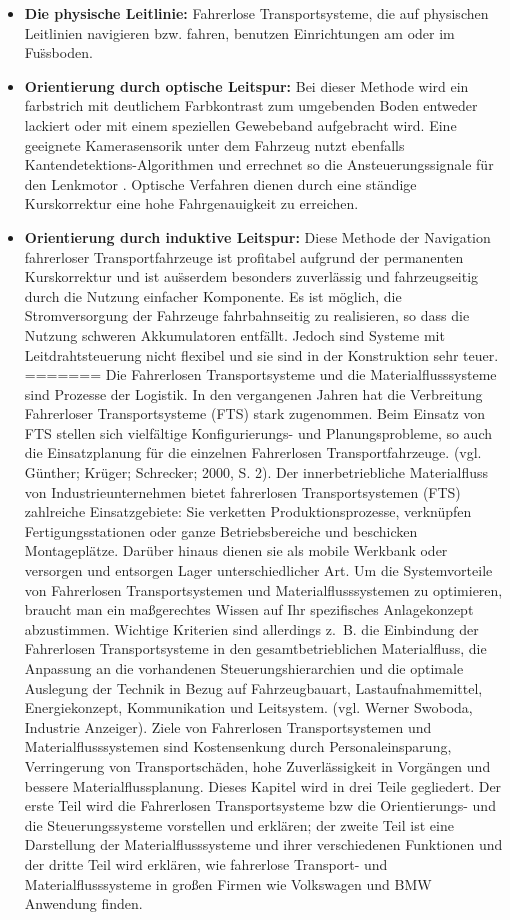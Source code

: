 \begin{itemize}
	\item \textbf{Die physische Leitlinie:}  Fahrerlose Transportsysteme, die auf physischen Leitlinien navigieren bzw. fahren, benutzen Einrichtungen am oder im Fu\"ssboden. 
 \item \textbf{Orientierung durch optische Leitspur:} Bei dieser Methode wird ein farbstrich mit deutlichem Farbkontrast zum umgebenden Boden entweder lackiert oder mit einem speziellen Gewebeband aufgebracht wird. Eine geeignete Kamerasensorik unter dem Fahrzeug nutzt ebenfalls Kantendetektions-Algorithmen  und errechnet so die Ansteuerungssignale f\"ur den Lenkmotor \cite[S. 112]{Guenther:2011}. Optische Verfahren dienen durch eine st\"andige Kurskorrektur eine hohe  Fahrgenauigkeit zu erreichen. 
\item \textbf{Orientierung durch induktive Leitspur:} Diese Methode der Navigation fahrerloser Transportfahrzeuge ist profitabel aufgrund der permanenten Kurskorrektur und ist au\"sserdem besonders zuverl\"assig und fahrzeugseitig durch die Nutzung einfacher Komponente. Es ist m\"oglich, die Stromversorgung der Fahrzeuge fahrbahnseitig zu realisieren, so dass die Nutzung schweren Akkumulatoren entf\"allt. Jedoch sind Systeme mit Leitdrahtsteuerung nicht flexibel und sie sind in der Konstruktion sehr teuer.
=======
Die Fahrerlosen Transportsysteme und die Materialflusssysteme sind Prozesse der Logistik. In den vergangenen Jahren hat die Verbreitung Fahrerloser Transportsysteme (FTS) stark zugenommen. Beim Einsatz von FTS stellen sich vielfältige Konfigurierungs- und Planungsprobleme, so auch die Einsatzplanung f\"ur die einzelnen Fahrerlosen Transportfahrzeuge. (vgl. Günther; Krüger; Schrecker; 2000, S. 2). Der innerbetriebliche Materialfluss von Industrieunternehmen bietet fahrerlosen Transportsystemen (FTS) zahlreiche Einsatzgebiete: Sie verketten Produktionsprozesse, verknüpfen Fertigungsstationen oder ganze Betriebsbereiche und beschicken Montageplätze. Darüber hinaus dienen sie als mobile Werkbank oder versorgen und entsorgen Lager unterschiedlicher Art. Um die Systemvorteile von Fahrerlosen Transportsystemen und Materialflusssystemen zu optimieren, braucht man ein ma\ss gerechtes Wissen auf Ihr spezifisches Anlagekonzept abzustimmen. Wichtige Kriterien sind allerdings z.~B. die Einbindung der Fahrerlosen Transportsysteme in den gesamtbetrieblichen Materialfluss, die Anpassung an die vorhandenen Steuerungshierarchien und die optimale Auslegung der Technik in Bezug auf Fahrzeugbauart, Lastaufnahmemittel, Energiekonzept, Kommunikation und Leitsystem. (vgl. Werner Swoboda, Industrie Anzeiger). Ziele von Fahrerlosen Transportsystemen und Materialflusssystemen sind Kostensenkung durch Personaleinsparung, Verringerung von Transportsch\"aden, hohe Zuverl\"assigkeit in Vorg\"angen und bessere Materialflussplanung.
Dieses Kapitel wird in drei Teile gegliedert. Der erste Teil wird die Fahrerlosen Transportsysteme bzw die Orientierungs- und die Steuerungssysteme vorstellen und erkl\"aren; der zweite Teil ist eine Darstellung der Materialflusssysteme und ihrer verschiedenen Funktionen und der dritte Teil wird erkl\"aren, wie fahrerlose Transport- und Materialflusssysteme in gro\ss en Firmen wie Volkswagen und BMW Anwendung finden.


\end{itemize}

